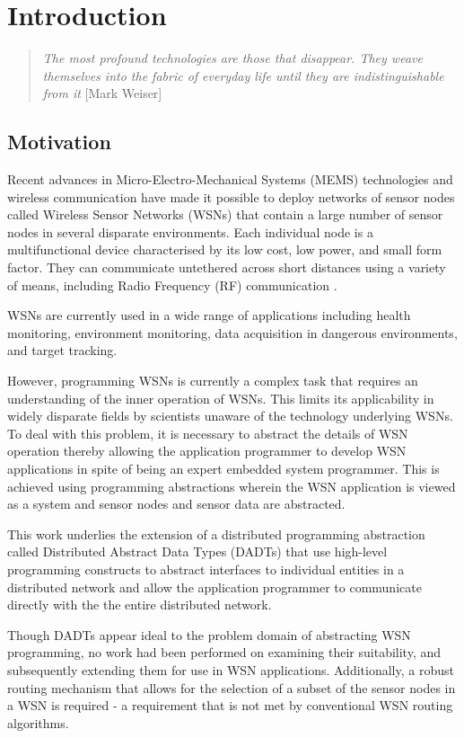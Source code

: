 \chapter{Introduction} \label{chap:Intro}

\begin{quote}
\emph{The most profound technologies are those that disappear. They weave
themselves into the fabric of everyday life until they are indistinguishable
from it} [Mark Weiser]
\end{quote}

\section{Motivation}
Recent advances in Micro-Electro-Mechanical Systems (MEMS)
technologies and wireless communication have made it possible to deploy networks
of sensor nodes called Wireless Sensor Networks (WSNs) that contain a large
number of sensor nodes in several disparate environments. Each individual node is
a multifunctional device characterised by its low cost, low power, and small form
factor. They can communicate untethered across short distances using a variety of
means, including Radio Frequency (RF) communication
\cite{SensorSurveyAkyildiz:2002}.

WSNs are currently used in a wide range of applications including health
monitoring, environment monitoring, data acquisition in dangerous environments,
and target tracking.

However, programming WSNs is currently a complex task that requires an
understanding of the inner operation of WSNs. This limits its applicability in
widely disparate fields by scientists unaware of the technology underlying WSNs.
To deal with this problem, it is necessary to abstract the details of WSN operation
thereby allowing the application programmer to develop WSN applications in spite
of being an expert embedded system programmer. This is
achieved using programming abstractions wherein the WSN application is viewed as a system
and sensor nodes and sensor data are abstracted.

This work underlies the extension of a distributed programming abstraction called
Distributed Abstract Data Types (DADTs) \cite{migliavacca_DADT:2006} that use
high-level programming constructs to abstract interfaces to individual entities
in a distributed network and allow the application programmer to communicate
directly with the the entire distributed network.

Though DADTs appear ideal to the problem domain of abstracting WSN programming,
no work had been performed on examining their suitability, and subsequently
extending them for use in WSN applications. Additionally, a robust routing
mechanism that allows for the selection of a subset of the sensor nodes in a WSN
is required - a requirement that is not met by conventional WSN routing
algorithms.

